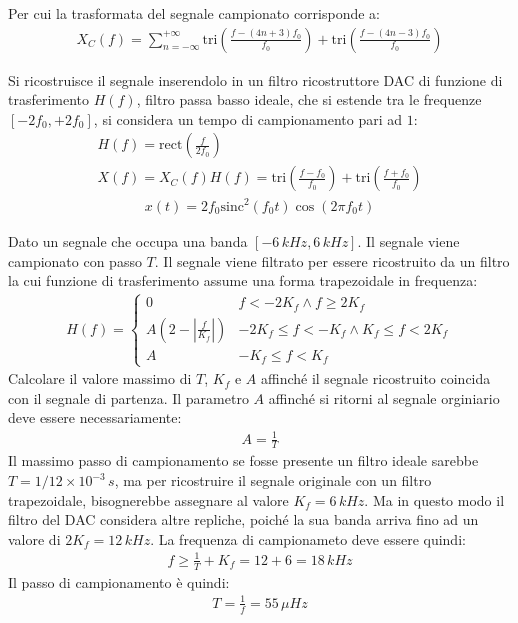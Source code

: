 \documentclass{article}
\begin{document}
Per cui la trasformata del segnale campionato corrisponde a:
\begin{gather*}
    X_C(f)=\displaystyle\sum_{n=-\infty}^{+\infty}\mbox{tri}\left(\frac{f-(4n+3)f_0}{f_0}\right)+\mbox{tri}\left(\frac{f-(4n-3)f_0}{f_0}\right)
\end{gather*}

Si ricostruisce il segnale inserendolo in un filtro ricostruttore DAC di funzione di trasferimento $H(f)$, filtro passa basso ideale, che si estende tra le 
frequenze $[-2f_0,+2f_0]$, si considera un tempo di campionamento pari ad $1$:
\begin{gather*}
    H(f)=\displaystyle\mbox{rect}\left(\frac{f}{2f_0}\right)\\
    X(f)=X_C(f)H(f)=\displaystyle\mbox{tri}\left(\frac{f-f_0}{f_0}\right)+\mbox{tri}\left(\frac{f+f_0}{f_0}\right)
\end{gather*}
\begin{gather}
    x(t)=2f_0\mbox{sinc}^2(f_0t)\cos(2\pi f_0t)
\end{gather} 



Dato un segnale che occupa una banda $[-6\,kHz, 6\,kHz]$. Il segnale viene campionato con passo $T$. Il segnale viene filtrato per essere ricostruito da un filtro 
la cui funzione di trasferimento assume una forma trapezoidale in frequenza:
\begin{gather*}
    H(f)=\begin{cases}
        0 &f<-2K_f\land f\geq 2K_f\\
        A\left(2-\left|\displaystyle\frac{f}{K_f}\right|\right) &-2K_f\leq f<-K_f\land K_f\leq f<2K_f\\
        A & -K_f\leq f<K_f
    \end{cases}
\end{gather*}
Calcolare il valore massimo di $T$, $K_f$ e $A$ affinché il segnale ricostruito coincida con il segnale di partenza. 
Il parametro $A$ affinché si ritorni al segnale orginiario deve essere necessariamente: 
\begin{gather}
    A=\displaystyle\frac{1}{T}
\end{gather}
Il massimo passo di campionamento se fosse presente un filtro ideale sarebbe $T=1/12\times10^{-3}\,s$, ma per ricostruire il segnale originale con un filtro trapezoidale, bisognerebbe 
assegnare al valore $K_f=6\,kHz$. Ma in questo modo il filtro del DAC considera altre repliche, poiché la sua banda arriva fino ad un valore di $2K_f=12\,kHz$. La frequenza di 
campionameto deve essere quindi:
\begin{gather*}
    f\geq\displaystyle\frac{1}{T}+K_f=12+6=18\,kHz
\end{gather*}
Il passo di campionamento è quindi:
\begin{gather}
    T=\displaystyle\frac{1}{f}=55\,\mu Hz
\end{gather}
\end{document}
